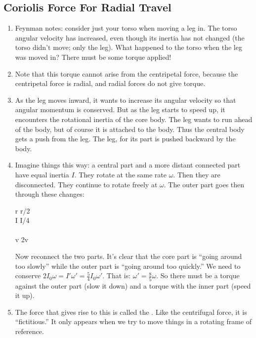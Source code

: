 \subsection{Coriolis Force For Radial Travel}

\begin{enumerate}

  \item Feynman notes: consider just your torso when moving a leg in.
  The torso angular velocity has increased, even though its inertia has
  not changed (the torso didn't move; only the leg). What happened to
  the torso when the leg was moved in? There must be some torque
  applied!

  \item Note that this torque cannot arise from the centripetal force,
  because the centripetal force is radial, and radial forces do not give
  torque.

  \item As the leg moves inward, it wants to increase its angular
  velocity so that angular momentum is conserved. But as the leg starts
  to speed up, it encounters the rotational inertia of the core body.
  The leg wants to run ahead of the body, but of course it is attached
  to the body. Thus the central body gets a push from the leg. The leg,
  for its part is pushed backward by the body.

  \item Imagine things this way: a central part and a more distant
  connected part have equal inertia $I$. They rotate at the same rate
  $\omega$. Then they are disconnected. They continue to rotate freely
  at $\omega$. The outer part goes then through these changes:

  \begin{nedqn}
    r \mapstocol r/2
  \\
    I \mapstocol I/4
  \\
    \omega {}\omega
  \\
    v \mapstocol 2v
  \end{nedqn}

  \noindent
  Now reconnect the two parts. It's clear that the core part is ``going
  around too slowly'' while the outer part is ``going around too
  quickly.'' We need to conserve $2I_0 \omega = I' \omega' = \frac{5}{4}
  I_0 \omega'$. That is: $\omega' = \frac{8}{5} \omega$. So there must
  be a torque against the outer part (slow it down) and a torque with
  the inner part (speed it up).

  \item The force that gives rise to this is called the . Like the centrifugal force, it is ``fictitious.'' It only
  appears when we try to move things in a rotating frame of reference.


\end{enumerate}
